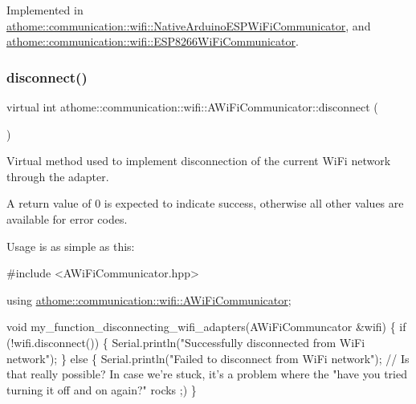 Implemented in \mbox{\hyperlink{classathome_1_1communication_1_1wifi_1_1_native_arduino_e_s_p_wi_fi_communicator_abc07f2d953fa91f86b8919858e10bbd7}{athome\+::communication\+::wifi\+::\+Native\+Arduino\+E\+S\+P\+Wi\+Fi\+Communicator}}, and \mbox{\hyperlink{classathome_1_1communication_1_1wifi_1_1_e_s_p8266_wi_fi_communicator_a58cc439be2f368b346bbbe1601a9b675}{athome\+::communication\+::wifi\+::\+E\+S\+P8266\+Wi\+Fi\+Communicator}}.

\mbox{\label{classathome_1_1communication_1_1wifi_1_1_a_wi_fi_communicator_a6131240ac0daa0f9fb4d46871feea4c2}} 
\subsubsection{\texorpdfstring{disconnect()}{disconnect()}}
{\footnotesize\ttfamily virtual int athome\+::communication\+::wifi\+::\+A\+Wi\+Fi\+Communicator\+::disconnect (\begin{DoxyParamCaption}{ }\end{DoxyParamCaption})\hspace{0.3cm}{\ttfamily [pure virtual]}}

Virtual method used to implement disconnection of the current Wi\+Fi network through the adapter.

A return value of 0 is expected to indicate success, otherwise all other values are available for error codes.

Usage is as simple as this\+:


\begin{DoxyCode}
\textcolor{preprocessor}{#include <AWiFiCommunicator.hpp>}

\textcolor{keyword}{using} \mbox{\hyperlink{classathome_1_1communication_1_1wifi_1_1_a_wi_fi_communicator}{athome::communication::wifi::AWiFiCommunicator}};

\textcolor{keywordtype}{void} my\_function\_disconnecting\_wifi\_adapters(AWiFiCommuncator &wifi) \{
  \textcolor{keywordflow}{if} (!wifi.disconnect()) \{
    Serial.println(\textcolor{stringliteral}{"Successfully disconnected from WiFi network"});
  \} \textcolor{keywordflow}{else} \{
    Serial.println(\textcolor{stringliteral}{"Failed to disconnect from WiFi network"}); \textcolor{comment}{// Is that}
really possible? In \textcolor{keywordflow}{case} we\textcolor{stringliteral}{'re stuck, it'}s a problem where the \textcolor{stringliteral}{"have you}
\textcolor{stringliteral}{tried turning it off and on again?"} rocks ;)
\}
\end{DoxyCode}
 

